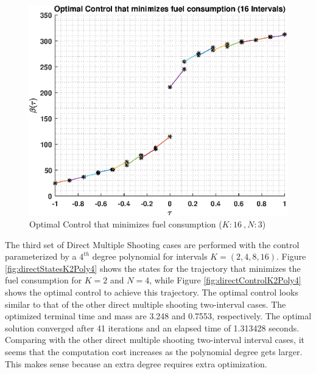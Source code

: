 \documentclass[]{article}
\begin{document}
\begin{figure}
	\centering
	\includegraphics[scale=0.75]{directControlK16Poly3.eps}
	\caption{Optimal Control that minimizes fuel consumption (\(K:16\ , N:3\))}
	\label{fig:directControlK16Poly3}
\end{figure}
\FloatBarrier
\noindent
The third set of Direct Multiple Shooting cases are performed with the control parameterized by a \(4^{th}\) degree polynomial for intervals \(K = (2,4,8,16)\). Figure \ref{fig:directStatesK2Poly4} shows the states for the trajectory that minimizes the fuel consumption for \(K = 2\) and  \(N = 4\), while Figure \ref{fig:directControlK2Poly4} shows the optimal control to achieve this trajectory. The optimal control looks similar to that of the other direct multiple shooting two-interval cases. The optimized terminal time and mass are 3.248 and 0.7553, respectively. The optimal solution converged after 41 iterations and an elapsed time of 1.313428 seconds. Comparing with the other direct multiple shooting two-interval interval cases, it seems that the computation cost increases as the polynomial degree gets larger. This makes sense because an extra degree requires extra optimization.
\end{document}
